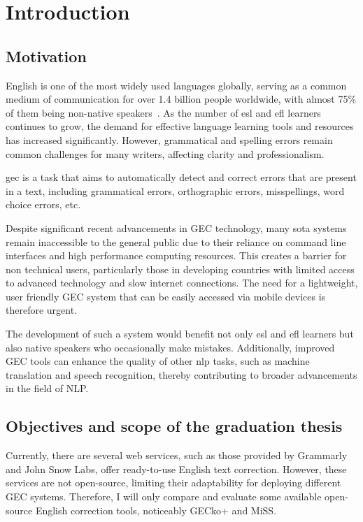 \chapter{Introduction}

\section{Motivation}
\label{section:motivation}

English is one of the most widely used languages globally, serving as a common medium of communication for over 1.4 billion people worldwide, with almost 75\% of them being non-native speakers~\citep{eberhard2015ethnologue}.
As the number of \acrfull{esl} and \acrfull{efl} learners continues to grow, the demand for effective language learning tools and resources has increased significantly.
However, grammatical and spelling errors remain common challenges for many writers, affecting clarity and professionalism.

\acrfull{gec} is a task that aims to automatically detect and correct errors that are present in a text, including grammatical errors, orthographic errors, misspellings, word choice errors, etc. \citep{ng-etal-2014-conll}

Despite significant recent advancements in GEC technology, many \acrfull{sota} systems remain inaccessible to the general public due to their reliance on command line interfaces and high performance computing resources.
This creates a barrier for non technical users, particularly those in developing countries with limited access to advanced technology and slow internet connections.
The need for a lightweight, user friendly GEC system that can be easily accessed via mobile devices is therefore urgent.

The development of such a system would benefit not only \acrshort{esl} and \acrshort{efl} learners but also native speakers who occasionally make mistakes.
Additionally, improved GEC tools can enhance the quality of other \acrfull{nlp} tasks, such as machine translation and speech recognition, thereby contributing to broader advancements in the field of NLP.

\section{Objectives and scope of the graduation thesis}
\label{section:objective}

Currently, there are several web services, such as those provided by Grammarly and John Snow Labs, offer ready-to-use English text correction.
However, these services are not open-source, limiting their adaptability for deploying different GEC systems.
Therefore, I will only compare and evaluate some available open-source English correction tools, noticeably GECko+ and MiSS.

